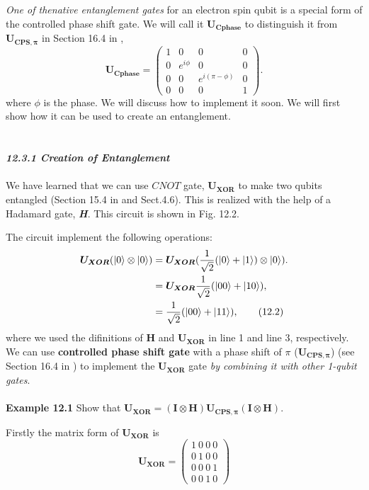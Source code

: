 \documentclass{article}
\newcommand{\bfit}[1]{\textit{\textbf{#1}}}
\begin{document}
\textit{One of thenative entanglement gates} for an electron spin qubit is a special form of the controlled
phase shift gate. We will call it $\boldsymbol{U_{Cphase}}$ \cite{meunier2011efficient} to distinguish it from 
$\boldsymbol{U_{C P S, \pi}}$ in Section 16.4 in \cite{WongHuiYong},
\begin{equation}\label{eq 12.1}
  \boldsymbol{U_{Cphase}}=\begin{pmatrix}
    1&0&0&0\\0&e^{i\phi}&0&0\\0&0&e^{i(\pi-\phi)}&0\\0&0&0&1
  \end{pmatrix}.\tag{12.1}
\end{equation}
where $\phi$ is the phase. We will discuss how to implement it soon. We will first show how it can be used to create an entanglement.
\\\\\\
\bfit{\large 12.3.1 Creation of Entanglement}
\\\\
We have learned that we can use $C N O T$ gate, $\boldsymbol{U_{XOR}}$ to make two qubits entangled (Section 15.4 in \cite{WongHuiYong} and Sect.4.6). This is
realized with the help of a Hadamard gate, \bfit{H}. This circuit is shown in Fig. 12.2.

The circuit implement the following operations:
\begin{align*}\label{eq 12.2}
  \boldsymbol{U_{XOR}}(\ket{0}\otimes\ket{0})&=\boldsymbol{U_{XOR}}(\frac{1}{\sqrt{2}}(\ket{0}+\ket{1})\otimes\ket{0}).\\
  &=\boldsymbol{U_{XOR}}\frac{1}{\sqrt{2}}(\ket{00}+\ket{10}),\\
  &=\frac{1}{\sqrt{2}}(\ket{00}+\ket{11}),\tag{12.2}
\end{align*}
where we used the difinitions of $\boldsymbol{H}$ and $\boldsymbol{U_{XOR}}$ in line 1 and line 3, respectively.
We can use \textbf{controlled phase shift gate} with a phase shift of $\pi$ ($\boldsymbol{U_{CPS,\pi}}$) (see Section 16.4
in \cite{WongHuiYong}) to implement the $\boldsymbol{U_{XOR}}$ gate \textit{by combining it with other 1-qubit gates}.
\\\\
\textbf{Example 12.1} Show that $\boldsymbol{U_{XOR}}=(\boldsymbol{I}\otimes\boldsymbol{H})\boldsymbol{U_{CPS,\pi}}(\boldsymbol{I}\otimes\boldsymbol{H})$.

Firstly the matrix form of $\boldsymbol{U_{XOR}}$ is
\begin{equation}\label{eq 12.3}
  \boldsymbol{U_{XOR}}=\begin{pmatrix}
    1\ 0\ 0\ 0\\ 0\ 1\ 0\ 0\\ 0\ 0\ 0\ 1\\ 0\ 0\ 1\ 0
  \end{pmatrix}\tag{12.3}
\end{equation}
\\
\end{document}
